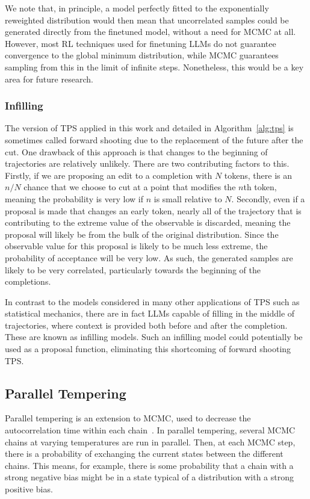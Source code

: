 \documentclass{article}
\begin{document}
We note that, in principle, a model perfectly fitted to the exponentially reweighted distribution would then mean that uncorrelated samples could be generated directly from the finetuned model, without a need for MCMC at all.
However, most RL techniques used for finetuning LLMs do not guarantee convergence to the global minimum distribution, while MCMC
guarantees sampling from this in the limit of infinite steps. Nonetheless, this would be a key area for future research.

\subsubsection{Infilling}
The version of TPS applied in this work and detailed in Algorithm~\ref{alg:tps} is sometimes called forward shooting due to the replacement of the future after the cut.
One drawback of this approach is that changes to the beginning of trajectories are relatively unlikely.
There are two contributing factors to this. Firstly, if we are proposing an edit to a completion with $N$ tokens, there is an $n/N$ chance that we choose to cut at a point that modifies the $n$th token, meaning the probability is very low if $n$ is small relative to $N$.
Secondly, even if a proposal is made that changes an early token, nearly all of the trajectory that is contributing to the extreme value of the observable is discarded, meaning the proposal will likely be from the bulk of the original distribution.
Since the observable value for this proposal is likely to be much less extreme, the probability of acceptance will be very low.
As such, the generated samples are likely to be very correlated, particularly towards the beginning of the completions.

In contrast to the models considered in many other applications of TPS such as statistical mechanics, there are in fact LLMs capable of filling in the middle of trajectories, where context is provided both before and after the completion.
These are known as infilling models. Such an infilling model could potentially be used as a proposal function, eliminating this shortcoming of forward shooting TPS.

\subsection{Parallel Tempering}
Parallel tempering is an extension to MCMC, used to decrease the autocorrelation time within each chain~\cite{earl2005parallel}.
In parallel tempering, several MCMC chains at varying temperatures are run in parallel. Then, at each MCMC step, there is a probability of exchanging the current states between the different chains. This means, for example, there is some probability that a chain with a strong negative bias might be in a state typical of a distribution with a strong positive bias.
\end{document}
